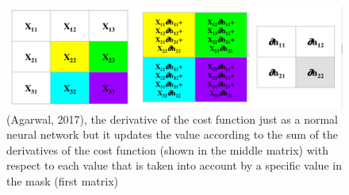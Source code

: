 \begin{figure}[h]
	\includegraphics[width=\textwidth]{fig11.png} 
	\caption{(Agarwal, 2017), the derivative of the cost function just as a normal neural network but it updates the value according to the sum of the derivatives of the cost function (shown in the middle matrix) with respect to each value that is taken into account by a specific value in the mask (first matrix)}
\end{figure}


